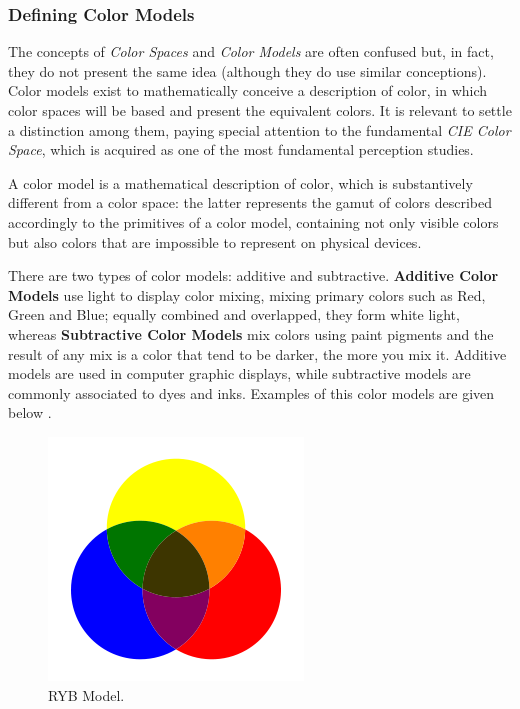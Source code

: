\subsubsection{Defining Color Models}		%
%
The concepts of \emph{Color Spaces} and \emph{Color Models} are often confused but, in fact, they do not present the same idea
(although they do use similar conceptions). Color models exist to mathematically conceive a description of color,
in which color spaces will be based and present the equivalent colors. It is relevant to settle a distinction among
them, paying special attention to the fundamental \emph{CIE Color Space}, which is acquired as one of the most
fundamental perception studies. \par
%
A color model is a mathematical description of color, which is substantively different from a color space: the latter represents
the gamut of colors described accordingly to the primitives of a color model, containing not only visible colors
but also colors that are impossible to represent on physical devices. \par
There are two types of color models: additive and subtractive. \textbf{Additive Color Models} use light
to display color mixing, mixing primary colors such as Red, Green and Blue; equally combined and
overlapped, they form white light, whereas \textbf{Subtractive Color Models} mix colors using paint pigments
and the result of any mix is a color that tend to be darker, the more you mix it. Additive models are used
in computer graphic displays, while subtractive models are commonly associated to dyes and inks. Examples
of this color models are given below \cite{Ware2012}. \par
%
\begin{figure}
  \centering
  \vspace{-10pt}
  \includegraphics[width=\linewidth]{images/background/RYB.png}
  \caption[RYB Color Model Schematic]{RYB Model.\protect\footnotemark{}}
  \label{fig:RYB}
\end{figure}
%
